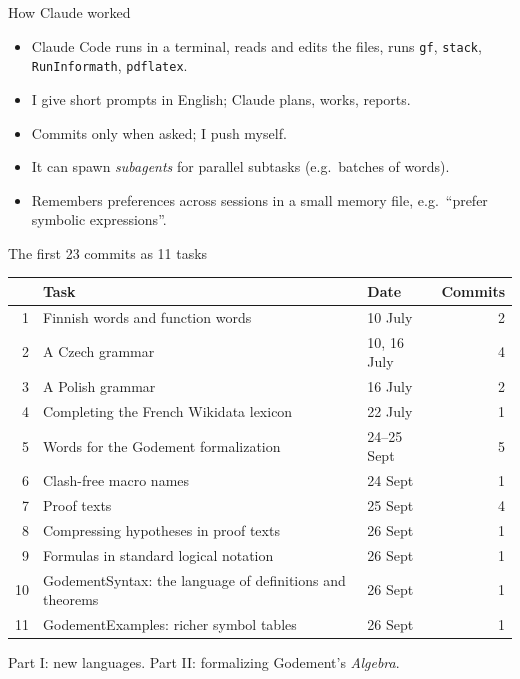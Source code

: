 \documentclass[10pt,aspectratio=169]{beamer}
\begin{document}
\begin{frame}{How Claude worked}
  \begin{itemize}
    \item Claude Code runs in a terminal, reads and edits the files, runs
          \texttt{gf}, \texttt{stack}, \texttt{RunInformath}, \texttt{pdflatex}.
    \item I give short prompts in English; Claude plans, works, reports.
    \item Commits only when asked; I push myself.
    \item It can spawn \emph{subagents} for parallel subtasks (e.g.\ batches of words).
    \item Remembers preferences across sessions in a small memory file,
          e.g.\ ``prefer symbolic expressions''.
  \end{itemize}
\end{frame}

\begin{frame}{The first 23 commits as 11 tasks}
  \footnotesize
  \begin{tabular}{rllr}
    \toprule
    & \textbf{Task} & \textbf{Date} & \textbf{Commits} \\
    \midrule
    1 & Finnish words and function words & 10 July & 2 \\
    2 & A Czech grammar & 10, 16 July & 4 \\
    3 & A Polish grammar & 16 July & 2 \\
    4 & Completing the French Wikidata lexicon & 22 July & 1 \\
    \midrule
    5 & Words for the Godement formalization & 24--25 Sept & 5 \\
    6 & Clash-free macro names & 24 Sept & 1 \\
    7 & Proof texts & 25 Sept & 4 \\
    8 & Compressing hypotheses in proof texts & 26 Sept & 1 \\
    9 & Formulas in standard logical notation & 26 Sept & 1 \\
    10 & GodementSyntax: the language of definitions and theorems & 26 Sept & 1 \\
    11 & GodementExamples: richer symbol tables & 26 Sept & 1 \\
    \bottomrule
  \end{tabular}

  \vspace{0.5em}
  Part I: new languages. \quad Part II: formalizing Godement's \emph{Algebra}.
\end{frame}
\end{document}
